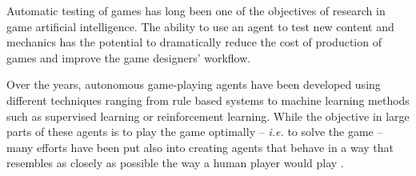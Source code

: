 \documentclass[conference]{IEEEtran}
\begin{document}
Automatic testing of games has long been one of the objectives of research in game artificial intelligence. 
The ability to use an agent to test new content and mechanics has the potential to dramatically reduce the cost of production of games and improve the game designers' workflow. 



Over the years, autonomous game-playing agents have been developed using different techniques ranging from rule based systems to machine learning methods such as supervised learning or reinforcement learning. 
While the objective in large parts of these agents is to play the game optimally -- \emph{i.e.} to solve the game -- many efforts have been put also into creating agents that behave in a way that resembles as closely as possible the way a human player would play \cite{Hingston2009ABots}.
\end{document}
